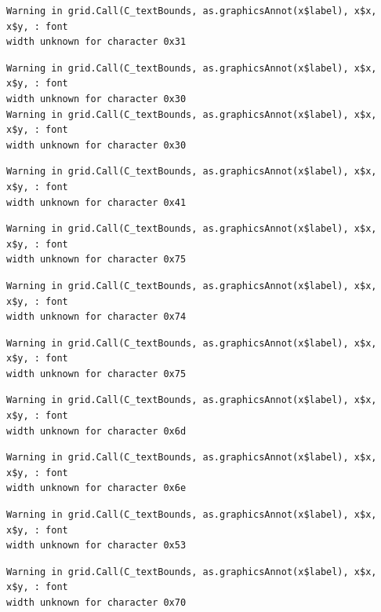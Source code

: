 \documentclass[
  letterpaper,
]{scrbook}
\begin{document}
\begin{verbatim}
Warning in grid.Call(C_textBounds, as.graphicsAnnot(x$label), x$x, x$y, : font
width unknown for character 0x31
\end{verbatim}

\begin{verbatim}
Warning in grid.Call(C_textBounds, as.graphicsAnnot(x$label), x$x, x$y, : font
width unknown for character 0x30
Warning in grid.Call(C_textBounds, as.graphicsAnnot(x$label), x$x, x$y, : font
width unknown for character 0x30
\end{verbatim}

\begin{verbatim}
Warning in grid.Call(C_textBounds, as.graphicsAnnot(x$label), x$x, x$y, : font
width unknown for character 0x41
\end{verbatim}

\begin{verbatim}
Warning in grid.Call(C_textBounds, as.graphicsAnnot(x$label), x$x, x$y, : font
width unknown for character 0x75
\end{verbatim}

\begin{verbatim}
Warning in grid.Call(C_textBounds, as.graphicsAnnot(x$label), x$x, x$y, : font
width unknown for character 0x74
\end{verbatim}

\begin{verbatim}
Warning in grid.Call(C_textBounds, as.graphicsAnnot(x$label), x$x, x$y, : font
width unknown for character 0x75
\end{verbatim}

\begin{verbatim}
Warning in grid.Call(C_textBounds, as.graphicsAnnot(x$label), x$x, x$y, : font
width unknown for character 0x6d
\end{verbatim}

\begin{verbatim}
Warning in grid.Call(C_textBounds, as.graphicsAnnot(x$label), x$x, x$y, : font
width unknown for character 0x6e
\end{verbatim}

\begin{verbatim}
Warning in grid.Call(C_textBounds, as.graphicsAnnot(x$label), x$x, x$y, : font
width unknown for character 0x53
\end{verbatim}

\begin{verbatim}
Warning in grid.Call(C_textBounds, as.graphicsAnnot(x$label), x$x, x$y, : font
width unknown for character 0x70
\end{verbatim}
\end{document}
